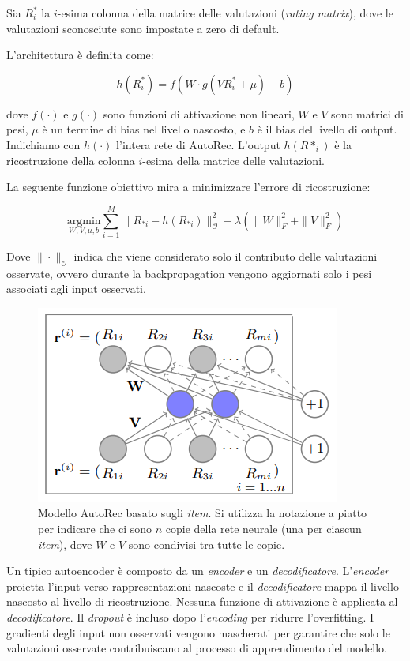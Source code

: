 Sia $R^*_i$ la $i$-esima colonna della matrice delle valutazioni (\textit{rating matrix}), dove le valutazioni sconosciute sono impostate a zero di default.

L'architettura è definita come:

\[
h(R^*_i) = f\left( W \cdot g\left( VR^*_i + \mu \right) + b \right)
\]

dove $f(\cdot)$ e $g(\cdot)$ sono funzioni di attivazione non lineari, $W$ e $V$ sono matrici di pesi, $\mu$ è un termine di bias nel livello nascosto, e $b$ è il bias del livello di output. Indichiamo con $h(\cdot)$ l'intera rete di AutoRec. L'output $h(R*_{i})$ è la ricostruzione della colonna $i$-esima della matrice delle valutazioni.

La seguente funzione obiettivo mira a minimizzare l'errore di ricostruzione:

\[
\underset{W, V, \mu, b}{\mathrm{argmin}} \sum_{i=1}^M{\parallel R_{*i} - h(R_{*i}) \parallel_{\mathcal{O}}^2} + \lambda(\| W \|_F^2 + \| V \|_F^2)
\]

Dove $ \| \cdot \|_{\mathcal{O}}$ indica che viene considerato solo il contributo delle valutazioni osservate, ovvero durante la backpropagation vengono aggiornati solo i pesi associati agli input osservati.

\begin{figure}[H]
    \centering
    \includegraphics[keepaspectratio]{figures/algorithms/auto_rc.PNG}
    \caption{Modello AutoRec basato sugli \textit{item}. Si utilizza la notazione a piatto per indicare che ci sono $n$ copie della rete neurale (una per ciascun \textit{item}), dove $W$ e $V$ sono condivisi tra tutte le copie.}
    \label{fig:auto_rec}
\end{figure}

Un tipico autoencoder è composto da un \textit{encoder} e un \textit{decodificatore}. L'\textit{encoder} proietta l'input verso rappresentazioni nascoste e il \textit{decodificatore} mappa il livello nascosto al livello di ricostruzione. Nessuna funzione di attivazione è applicata al \textit{decodificatore}. Il \textit{dropout} è incluso dopo l'\textit{encoding} per ridurre l'overfitting. I gradienti degli input non osservati vengono mascherati per garantire che solo le valutazioni osservate contribuiscano al processo di apprendimento del modello.

